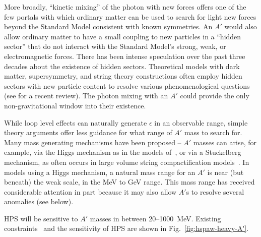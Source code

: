 More broadly, ``kinetic mixing'' of the photon with new forces offers one of the few 
portals with which ordinary matter can be used to search for light new forces beyond the Standard Model
consistent with known symmetries. 
An $A'$ would also allow ordinary matter to have a small coupling to new particles in a ``hidden sector'' 
that do not interact with the Standard Model's strong, weak, or electromagnetic forces.  
There has been intense speculation over the past three decades about the existence 
of hidden sectors. Theoretical models with dark matter, supersymmetry, and string theory constructions often employ 
hidden sectors with new particle content to resolve various phenomenological questions~\cite{Goodsell:2010ie,NSF-ITP-84-170,PRINT-86-0084 (PRINCETON),Andreas:2011in,arXiv:1002.0329} 
(see \cite{Hewett:2012ns} for a recent review). 
The photon mixing with an $A'$ could provide the only non-gravitational window into their existence. 

While loop level effects can naturally generate $\epsilon$ in an observable range, 
simple theory arguments offer less guidance for what range of $A'$ mass to search for. 
Many mass generating mechanisms have been proposed -- $A'$ masses can arise, for example, 
via the Higgs mechanism as in the models of~\cite{Fayet:2007ua,Cheung:2009qd,ArkaniHamed:2008qp,Morrissey:2009ur},
or via a Stuckelberg mechanism, as often occurs in large volume string compactification models~\cite{Hewett:2012ns}.
In models using a Higgs mechanism, a natural mass range for an $A'$ is near (but beneath) the weak scale, 
in the MeV to GeV range. This mass range has received considerable attention in part because it may also 
allow $A'$s to resolve several anomalies (see below). 

HPS will be sensitive to $A'$ masses in between 20--1000~MeV. Existing constraints~\cite{endo:g2e} and the sensitivity of HPS are 
shown in Fig.~\ref{fig:hspaw-heavy-A'}. 

